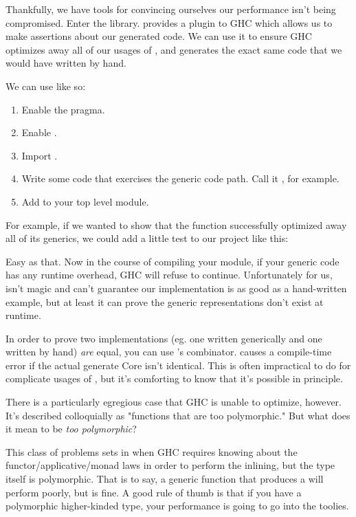 \documentclass[book.tex]{subfiles}
\begin{document}
Thankfully, we have tools for convincing ourselves our performance isn't being
compromised. Enter the \cite{inspection-testing}
library.  provides a plugin to GHC which allows us to
make assertions about our generated code. We can use it to ensure GHC optimizes
away all of our usages of , and generates the exact same code
that we would have written by hand.

We can use  like so:


\begin{enumerate}
  \item{Enable the  pragma.}
  \item{Enable .}
  \item{Import .}
  \item{Write some code that exercises the generic code path. Call it ,
    for example.}
  \item{Add  to your top level module.}
\end{enumerate}

For example, if we wanted to show that the  function successfully
optimized away all of its generics, we could add a little test to our project
like this:


Easy as that. Now in the course of compiling your module, if your generic code
has any runtime overhead, GHC will refuse to continue. Unfortunately for us,
 isn't magic and can't guarantee our implementation is
as good as a hand-written example, but at least it can prove the generic
representations don't exist at runtime.

In order to prove two implementations (eg. one written generically and one
written by hand) \emph{are} equal, you can use 's
\hs{(===)} combinator. \hs{(===)} causes a compile-time error if the actual
generate Core isn't identical. This is often impractical to do for complicate
usages of , but it's comforting to know that it's possible in
principle.

There is a particularly egregious case that GHC is unable to optimize, however.
It's described colloquially as "functions that are too polymorphic." But what
does it mean to be \emph{too polymorphic}?

This class of problems sets in when GHC requires knowing about the
functor/applicative/monad laws in order to perform the inlining, but the type
itself is polymorphic. That is to say, a generic function that produces a
 will perform poorly, but  is fine. A good rule of
thumb is that if you have a polymorphic higher-kinded type, your performance is
going to go into the toolies.
\end{document}
